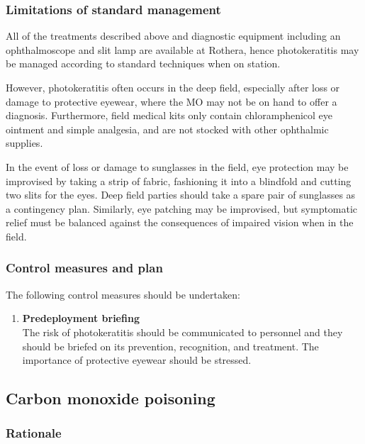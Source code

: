 \documentclass[12pt,a4paper]{article}
\newenvironment{boldenumerate}
    {\begin{enumerate}\renewcommand\labelenumi{\textbf\theenumi}}
    {\end{enumerate}}
\begin{document}
\subsubsection{Limitations of standard management}

All of the treatments described above and diagnostic equipment including an ophthalmoscope and slit lamp are available at Rothera, hence photokeratitis may be managed according to standard techniques when on station.\cite{Marquis:2013vg}

However, photokeratitis often occurs in the deep field, especially after loss or damage to protective eyewear, where the MO may not be on hand to offer a diagnosis. Furthermore, field medical kits only contain chloramphenicol eye ointment and simple analgesia, and are not stocked with other ophthalmic supplies.\cite{Marquis:2013vg}

In the event of loss or damage to sunglasses in the field, eye protection may be improvised by taking a strip of fabric, fashioning it into a blindfold and cutting two slits for the eyes.\cite{Wiseman:2003wx} Deep field parties should take a spare pair of sunglasses as a contingency plan. Similarly, eye patching may be improvised, but symptomatic relief must be balanced against the consequences of impaired vision when in the field.

\subsubsection{Control measures and plan}

The following control measures should be undertaken:

\begin{boldenumerate}
    \item \textbf{Predeployment briefing} \\
    The risk of photokeratitis should be communicated to personnel and they should be briefed on its prevention, recognition, and treatment. The importance of protective eyewear should be stressed.
\end{boldenumerate}


\subsection{Carbon monoxide poisoning}

\subsubsection{Rationale}
\end{document}
